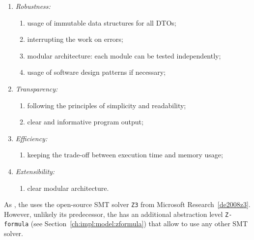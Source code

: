 \vspace{0.5em}
\begin{enumerate}[nolistsep]
  \item \textit{Robustness:}
    \begin{enumerate}[label*=\arabic*.]
      \item usage of immutable data structures for all DTOs;
      \item interrupting the work on errors;
      \item modular architecture: each module can be tested independently;
      \item usage of software design patterns if necessary;
    \end{enumerate}
  \item \textit{Transparency:}
    \begin{enumerate}[label*=\arabic*.]
      \item following the principles of simplicity and readability;
      \item clear and informative program output;
    \end{enumerate}
  \item \textit{Efficiency:}
    \begin{enumerate}[label*=\arabic*.]%
      \item keeping the trade-off between execution time and memory usage;
    \end{enumerate}
  \item \textit{Extensibility:}
    \begin{enumerate}[label*=\arabic*.]%
      \item clear modular architecture.
    \end{enumerate}
\end{enumerate}


As \porthos[1], the \porthos[2] uses the open-source SMT solver \texttt{Z3} from Microsoft Research~\ref{de2008z3}. However, unlikely its predecessor, the \porthos[2] has an additional abstraction level \texttt{Z-formula} (see Section~\ref{ch:impl:model:zformula}) that allow to use any other SMT solver. %


